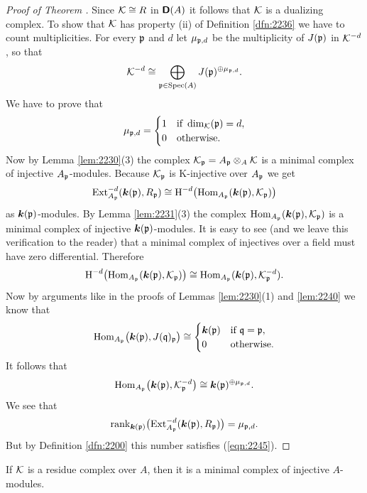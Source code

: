 \begin{proof}[Proof of Theorem \tup{\ref{thm:2245}}]
Since $\mathcal{K} \cong R$ in $\boldsymbol{\mathsf{D}}(A)$ it follows that $\mathcal{K}$ is a dualizing 
complex. To show that $\mathcal{K}$ has property (ii) of Definition \ref{dfn:2236} we 
have to count multiplicities. For every $\mathfrak{p}$ and $d$ let $\mu_{\mathfrak{p}, d}$ be the 
multiplicity of $J(\mathfrak{p})$ in $\mathcal{K}^{-d}$, so that  
\[ \mathcal{K}^{-d} \cong 
\bigoplus_{\mathfrak{p} \in \operatorname{Spec}(A)}  J(\mathfrak{p})^{\oplus \mu_{\mathfrak{p}, d}} . \]
We have to prove that 
\begin{equation} \label{eqn:2245}
\mu_{\mathfrak{p}, d} = 
\begin{cases}
1 & \textup{if} \ \operatorname{dim}_{\mathcal{K}}(\mathfrak{p}) = d ,  
\\
0 & \textup{otherwise} . 
\end{cases}
\end{equation}
Now by Lemma \ref{lem:2230}(3) the complex $\mathcal{K}_{\mathfrak{p}} = A_{\mathfrak{p}} \otimes_A \mathcal{K}$ is a  
minimal complex of injective  $A_{\mathfrak{p}}$-modules. Because $\mathcal{K}_{\mathfrak{p}}$ is 
K-injective over $A_{\mathfrak{p}}$ we get   
\[ \operatorname{Ext}^{-d}_{A_{\mathfrak{p}}}(\boldsymbol{k}(\mathfrak{p}), R_{\mathfrak{p}}) \cong
\operatorname{H}^{-d} \bigl( \operatorname{Hom}_{A_{\mathfrak{p}}}(\boldsymbol{k}(\mathfrak{p}), \mathcal{K}_{\mathfrak{p}}) \bigr)  \]
as $\boldsymbol{k}(\mathfrak{p})$-modules. By Lemma \ref{lem:2231}(3) the complex 
$\operatorname{Hom}_{A_{\mathfrak{p}}}(\boldsymbol{k}(\mathfrak{p}), \mathcal{K}_{\mathfrak{p}})$
is a  minimal complex of injective  $\boldsymbol{k}(\mathfrak{p})$-modules.
It is easy to see (and we leave this verification to the reader) that a 
minimal complex of injectives over a field must have zero differential. 
Therefore 
\[ \operatorname{H}^{-d} \bigl( \operatorname{Hom}_{A_{\mathfrak{p}}}(\boldsymbol{k}(\mathfrak{p}), \mathcal{K}_{\mathfrak{p}}) \bigr) \cong 
\operatorname{Hom}_{A_{\mathfrak{p}}}(\boldsymbol{k}(\mathfrak{p}), \mathcal{K}_{\mathfrak{p}}^{-d}) . \]
Now by arguments like in the proofs of Lemmas \ref{lem:2230}(1) 
and \ref{lem:2240} we know that 
\[ \operatorname{Hom}_{A_{\mathfrak{p}}} \bigl( \boldsymbol{k}(\mathfrak{p}), J(\mathfrak{q})_{\mathfrak{p}} \bigr) \cong 
\begin{cases}
\boldsymbol{k}(\mathfrak{p}) & \textup{if} \ \mathfrak{q} = \mathfrak{p} ,  
\\
0 & \textup{otherwise} . 
\end{cases} \]
It follows that 
\[ \operatorname{Hom}_{A_{\mathfrak{p}}} \bigl( \boldsymbol{k}(\mathfrak{p}), \mathcal{K}_{\mathfrak{p}}^{-d} \bigr) \cong 
\boldsymbol{k}(\mathfrak{p})^{\oplus \mu_{\mathfrak{p}, d}} . \]
We see that 
\[ \operatorname{rank}_{\boldsymbol{k}(\mathfrak{p})} \bigl( \operatorname{Ext}^{-d}_{A_{\mathfrak{p}}}(\boldsymbol{k}(\mathfrak{p}), R_{\mathfrak{p}}) \bigr) 
= \mu_{\mathfrak{p}, d} . \]
But by Definition \ref{dfn:2200} this number satisfies (\ref{eqn:2245}). 
\end{proof}

\begin{cor} \label{cor:2245}
If $\mathcal{K}$ is a residue complex over $A$, then it is a minimal complex 
of injective $A$-modules. 
\end{cor}


